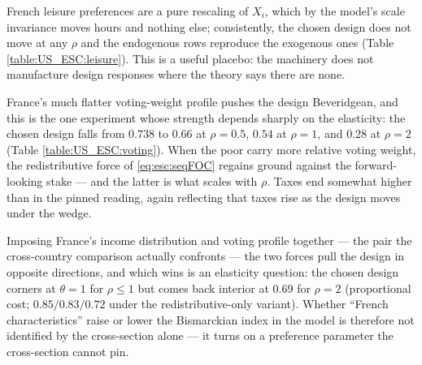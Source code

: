 

 French leisure preferences are a pure rescaling of $X_i$, which by the model's scale invariance moves hours and nothing else; consistently, the chosen design does not move at any $\rho$ and the endogenous rows reproduce the exogenous ones (Table \ref{table:US_ESC:leisure}). This is a useful placebo: the machinery does not manufacture design responses where the theory says there are none.



 France's much flatter voting-weight profile pushes the design Beveridgean, and this is the one experiment whose strength depends sharply on the elasticity: the chosen design falls from $0.738$ to $0.66$ at $\rho = 0.5$, $0.54$ at $\rho = 1$, and $0.28$ at $\rho = 2$ (Table \ref{table:US_ESC:voting}). When the poor carry more relative voting weight, the redistributive force of \eqref{eq:esc:seqFOC} regains ground against the forward-looking stake --- and the latter is what scales with $\rho$. Taxes end somewhat higher than in the pinned reading, again reflecting that taxes rise as the design moves under the wedge.



 Imposing France's income distribution and voting profile together --- the pair the cross-country comparison actually confronts --- the two forces pull the design in opposite directions, and which wins is an elasticity question: the chosen design corners at $\theta = 1$ for $\rho \leq 1$ but comes back interior at $0.69$ for $\rho = 2$ (proportional cost; $0.85/0.83/0.72$ under the redistributive-only variant). Whether ``French characteristics'' raise or lower the Bismarckian index in the model is therefore not identified by the cross-section alone --- it turns on a preference parameter the cross-section cannot pin.
